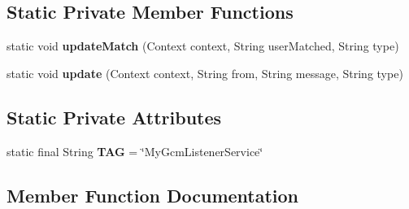 \subsection*{Static Private Member Functions}
\begin{DoxyCompactItemize}
\item 
static void {\bfseries update\+Match} (Context context, String user\+Matched, String type)\hypertarget{classcom_1_1example_1_1sebastian_1_1tindertp_1_1services_1_1MyGcmListenerService_a020d35e51e367509e0d7df3c42fc6df3}{}\label{classcom_1_1example_1_1sebastian_1_1tindertp_1_1services_1_1MyGcmListenerService_a020d35e51e367509e0d7df3c42fc6df3}

\item 
static void {\bfseries update} (Context context, String from, String message, String type)\hypertarget{classcom_1_1example_1_1sebastian_1_1tindertp_1_1services_1_1MyGcmListenerService_a7a0f68b8970db0fe0d8e2a895eac4389}{}\label{classcom_1_1example_1_1sebastian_1_1tindertp_1_1services_1_1MyGcmListenerService_a7a0f68b8970db0fe0d8e2a895eac4389}

\end{DoxyCompactItemize}
\subsection*{Static Private Attributes}
\begin{DoxyCompactItemize}
\item 
static final String {\bfseries T\+AG} = \char`\"{}My\+Gcm\+Listener\+Service\char`\"{}\hypertarget{classcom_1_1example_1_1sebastian_1_1tindertp_1_1services_1_1MyGcmListenerService_ad0b98b2dc4aaa5c9faf63cba7f154370}{}\label{classcom_1_1example_1_1sebastian_1_1tindertp_1_1services_1_1MyGcmListenerService_ad0b98b2dc4aaa5c9faf63cba7f154370}

\end{DoxyCompactItemize}


\subsection{Member Function Documentation}
